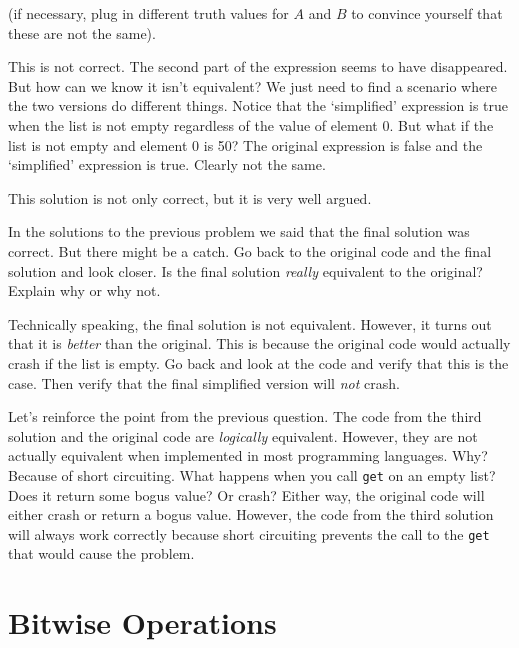 \begin{eval}
\begin{answer}
\begin{solevalenum}
(if necessary, plug in different truth values for $A$ and $B$ to convince yourself that these are not the same).
\item
This is not correct.  The second part of the expression seems to have disappeared.  
But how can we know it isn't equivalent?  We just need to find a scenario where the two versions do different
things. Notice that the `simplified' expression is true when the list is not empty regardless of the value of
element $0$.  But what if the list is not empty and element $0$ is 50?  The original expression is false and the
`simplified' expression is true.  Clearly not the same.
\item
This solution is not only correct, but it is very well argued.
\end{solevalenum}
\end{answer}
\end{eval}

\begin{ques}
In the solutions to the previous problem we said that the final solution was correct.
But there might be a catch.  Go back to the original code and the final solution
and look closer.  Is the final solution
{\em really} equivalent to the original?  Explain why or why not.\\
\evallinetwo
\begin{answer}
Technically speaking, the final solution is not equivalent.  
However, it turns out that it is {\em better} than the
original.  This is because the original code would actually crash if the list is empty.
Go back and look at the code and verify that this is the case.  
Then verify that the 
final simplified version will {\em not} crash.
\end{answer}
\end{ques}

Let's reinforce the point from the previous question.
The code from the third solution and the original code are
{\em logically} equivalent. 
However, they are not actually equivalent
when implemented in most programming languages. Why?
Because of short circuiting. 
What happens when you call \verb+get+ on an empty list? 
Does it return some bogus value? Or crash? Either way, 
the original code will either crash or return a bogus value.
However, the code from the third solution will always work 
correctly because short circuiting prevents the call to the
\verb+get+ that would cause the problem. 

\newpage

\section{Bitwise Operations}\label{section:bit}

